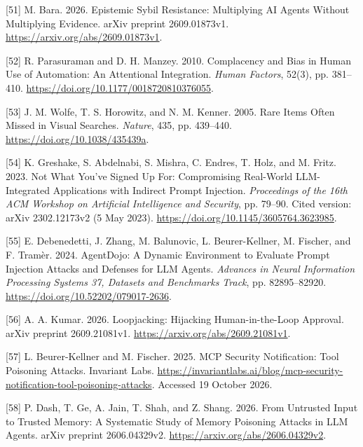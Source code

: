 \documentclass[acmlarge,review,anonymous,nonacm]{acmart}
\newlength{\cslhangindent}
\newlength{\cslentryspacingunit} %
\newenvironment{CSLReferences}[2] %
 {\bibliofont %
  \setlength{\parindent}{0pt}
  \ifodd #1
  \let\oldpar\par
  \def\par{\hangindent=\cslhangindent\oldpar}
  \fi
  \setlength{\parskip}{#2\cslentryspacingunit}
 }%
 {}
\begin{document}
\begin{CSLReferences}{1}{1}
\leavevmode{}%
{[}51{]} M. Bara. 2026. Epistemic Sybil Resistance: Multiplying AI
Agents Without Multiplying Evidence. arXiv preprint 2609.01873v1.
\url{https://arxiv.org/abs/2609.01873v1}.

\leavevmode{}%
{[}52{]} R. Parasuraman and D. H. Manzey. 2010. Complacency and Bias in
Human Use of Automation: An Attentional Integration. \emph{Human
Factors}, 52(3), pp. 381--410.
\url{https://doi.org/10.1177/0018720810376055}.

\leavevmode{}%
{[}53{]} J. M. Wolfe, T. S. Horowitz, and N. M. Kenner. 2005. Rare Items
Often Missed in Visual Searches. \emph{Nature}, 435, pp. 439--440.
\url{https://doi.org/10.1038/435439a}.

\leavevmode{}%
{[}54{]} K. Greshake, S. Abdelnabi, S. Mishra, C. Endres, T. Holz, and
M. Fritz. 2023. Not What You've Signed Up For: Compromising Real-World
LLM-Integrated Applications with Indirect Prompt Injection.
\emph{Proceedings of the 16th ACM Workshop on Artificial Intelligence
and Security}, pp. 79--90. Cited version: arXiv 2302.12173v2 (5 May
2023). \url{https://doi.org/10.1145/3605764.3623985}.

\leavevmode{}%
{[}55{]} E. Debenedetti, J. Zhang, M. Balunovic, L. Beurer-Kellner, M.
Fischer, and F. Tramèr. 2024. AgentDojo: A Dynamic Environment to
Evaluate Prompt Injection Attacks and Defenses for LLM Agents.
\emph{Advances in Neural Information Processing Systems 37, Datasets and
Benchmarks Track}, pp. 82895--82920.
\url{https://doi.org/10.52202/079017-2636}.

\leavevmode{}%
{[}56{]} A. A. Kumar. 2026. Loopjacking: Hijacking Human-in-the-Loop
Approval. arXiv preprint 2609.21081v1.
\url{https://arxiv.org/abs/2609.21081v1}.

\leavevmode{}%
{[}57{]} L. Beurer-Kellner and M. Fischer. 2025. MCP Security
Notification: Tool Poisoning Attacks. Invariant Labs.
\url{https://invariantlabs.ai/blog/mcp-security-notification-tool-poisoning-attacks}.
Accessed 19 October 2026.

\leavevmode{}%
{[}58{]} P. Dash, T. Ge, A. Jain, T. Shah, and Z. Shang. 2026. From
Untrusted Input to Trusted Memory: A Systematic Study of Memory
Poisoning Attacks in LLM Agents. arXiv preprint 2606.04329v2.
\url{https://arxiv.org/abs/2606.04329v2}.


\end{CSLReferences}
\end{document}
